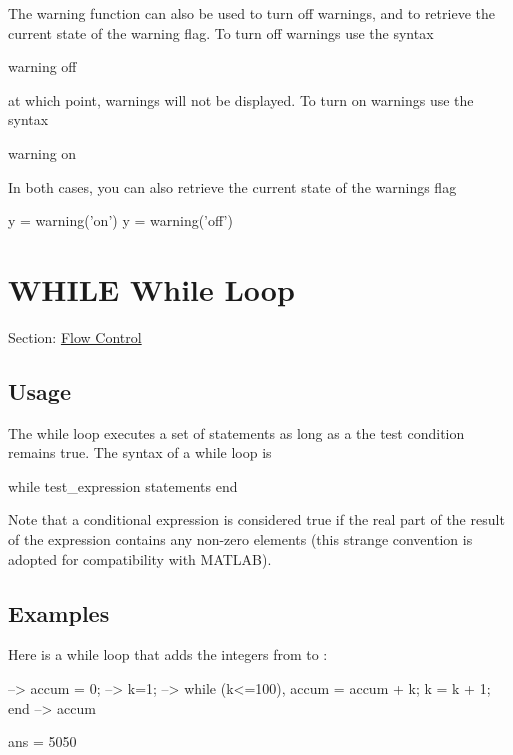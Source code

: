 The {\ttfamily warning} function can also be used to turn off warnings, and to retrieve the current state of the warning flag. To turn off warnings use the syntax \begin{DoxyVerb}   warning off
\end{DoxyVerb}
 at which point, warnings will not be displayed. To turn on warnings use the syntax \begin{DoxyVerb}   warning on
\end{DoxyVerb}
 In both cases, you can also retrieve the current state of the warnings flag \begin{DoxyVerb}   y = warning('on')
   y = warning('off')
\end{DoxyVerb}
 \hypertarget{flow_while}{}\section{W\-H\-I\-L\-E While Loop}\label{flow_while}
Section\-: \hyperlink{sec_flow}{Flow Control} \hypertarget{vtkwidgets_vtkxyplotwidget_Usage}{}\subsection{Usage}\label{vtkwidgets_vtkxyplotwidget_Usage}
The {\ttfamily while} loop executes a set of statements as long as a the test condition remains {\ttfamily true}. The syntax of a {\ttfamily while} loop is \begin{DoxyVerb}  while test_expression
     statements
  end
\end{DoxyVerb}
 Note that a conditional expression is considered true if the real part of the result of the expression contains any non-\/zero elements (this strange convention is adopted for compatibility with M\-A\-T\-L\-A\-B). \hypertarget{variables_matrix_Examples}{}\subsection{Examples}\label{variables_matrix_Examples}
Here is a {\ttfamily while} loop that adds the integers from {} to {}\-:


\begin{DoxyVerbInclude}
--> accum = 0;
--> k=1;
--> while (k<=100), accum = accum + k; k = k + 1; end
--> accum

ans = 
 5050 
\end{DoxyVerbInclude}
 